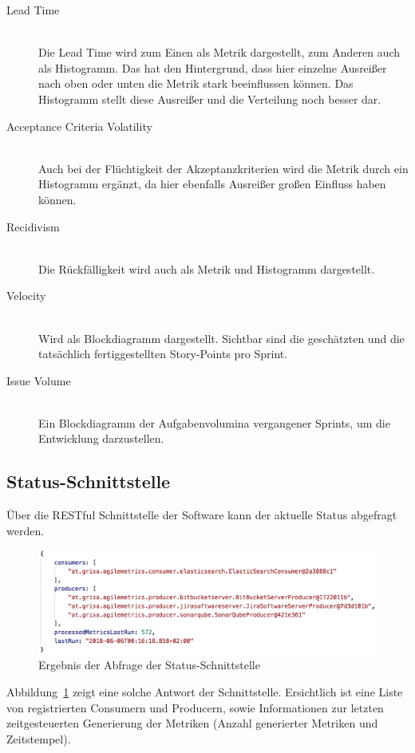 \begin{description}
    \item[Lead Time] \hfill \\ Die Lead Time wird zum Einen als Metrik dargestellt, zum Anderen auch als Histogramm. Das hat den Hintergrund, dass hier einzelne Ausreißer nach oben oder unten die Metrik stark beeinflussen können. Das Histogramm stellt diese Ausreißer und die Verteilung noch besser dar.
    \item[Acceptance Criteria Volatility] \hfill \\ Auch bei der Flüchtigkeit der Akzeptanzkriterien wird die Metrik durch ein Histogramm ergänzt, da hier ebenfalls Ausreißer großen Einfluss haben können.
    \item[Recidivism] \hfill \\ Die Rückfälligkeit wird auch als Metrik und Histogramm dargestellt.
    \item[Velocity] \hfill \\ Wird als Blockdiagramm dargestellt. Sichtbar sind die geschätzten und die tatsächlich fertiggestellten Story-Points pro Sprint.
    \item[Issue Volume] \hfill \\ Ein Blockdiagramm der Aufgabenvolumina vergangener Sprints, um die Entwicklung darzustellen.
\end{description}

\subsection{Status-Schnittstelle}

Über die RESTful Schnittstelle der Software kann der aktuelle Status abgefragt werden.

\begin{savenotes}
    \begin{figure}[H] 
        \centering
            \includegraphics[width=1.0\textwidth]{img/status-api.png}
        \caption{Ergebnis der Abfrage der Status-Schnittstelle}\label{fig:status-api}
    \end{figure}
\end{savenotes}

Abbildung~\ref{fig:status-api} zeigt eine solche Antwort der Schnittstelle. 
Ersichtlich ist eine Liste von registrierten Consumern und Producern, sowie Informationen zur letzten zeitgesteuerten Generierung der Metriken (Anzahl generierter Metriken und Zeitstempel).
